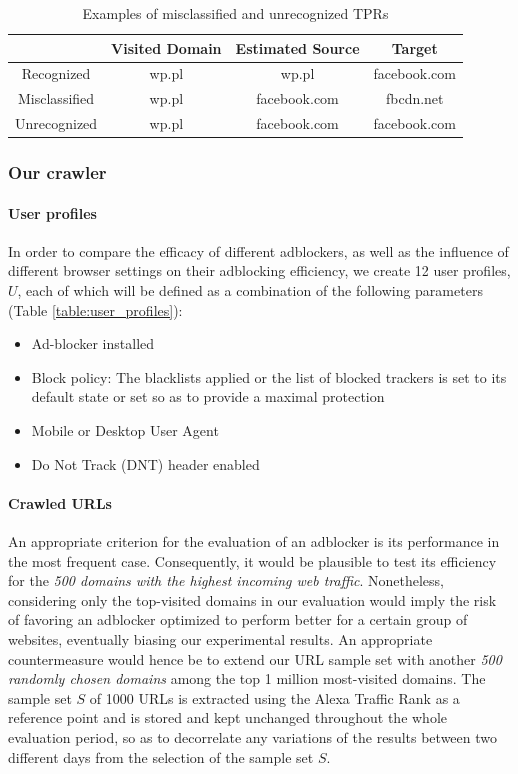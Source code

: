 \documentclass{sig-alternate}
\begin{document}
\begin{table}
\centering
\small
\begin{tabular}{|c|c c c|}
\hline
& Visited Domain & Estimated Source & Target \\
\hline
Recognized & wp.pl & wp.pl & facebook.com \\
Misclassified & wp.pl & facebook.com & fbcdn.net \\
Unrecognized & wp.pl & facebook.com & facebook.com \\
\hline
\end{tabular}
\caption{Examples of misclassified and unrecognized TPRs}
\label{table:false_positive_examples}
\end{table}

\subsubsection{Our crawler}
\paragraph{User profiles}
\label{sec:user_profiles}
In order to compare the efficacy of different adblockers, as well as the influence of different browser settings on their adblocking efficiency, we create 12 user profiles, $U$, each of which will be defined as a combination of the following parameters (Table \ref{table:user_profiles}):

\begin{itemize}
 \item Ad-blocker installed
 \item Block policy: The blacklists applied or the list of blocked trackers is set to its default state or set so as to provide a maximal protection
 \item Mobile or Desktop User Agent
 \item Do Not Track (DNT) header enabled
\end{itemize}


\paragraph{Crawled URLs}
An appropriate criterion for the evaluation of an adblocker is its performance in the most frequent case. Consequently, it would be plausible to test its efficiency for the \textit{500 domains with the highest incoming web traffic}. Nonetheless, considering only the top-visited domains in our evaluation would imply the risk of favoring an adblocker optimized to perform better for a certain group of websites, eventually biasing our experimental results. An appropriate countermeasure would hence be to extend our URL sample set with another \textit{500 randomly chosen domains} among the top 1 million most-visited domains. The sample set $S$ of 1000 URLs is extracted using the Alexa Traffic Rank as a reference point and is stored and kept unchanged throughout the whole evaluation period, so as to decorrelate any variations of the results between two different days from the selection of the sample set $S$.
\end{document}
